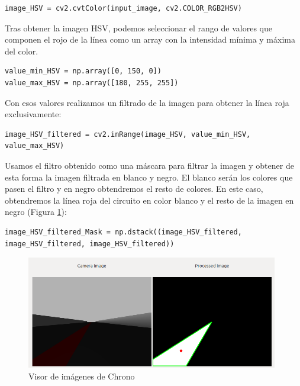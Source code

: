 \lstset{language=Python, breaklines=true, basicstyle=\footnotesize}
\begin{lstlisting}[frame=single]
image_HSV = cv2.cvtColor(input_image, cv2.COLOR_RGB2HSV)
\end{lstlisting}

Tras obtener la imagen HSV, podemos seleccionar el rango de valores que componen el rojo de la línea como un array con la intensidad mínima y máxima del color.

\lstset{language=Python, breaklines=true, basicstyle=\footnotesize}
\begin{lstlisting}[frame=single]
value_min_HSV = np.array([0, 150, 0])
value_max_HSV = np.array([180, 255, 255])
\end{lstlisting}

Con esos valores realizamos un filtrado de la imagen para obtener la línea roja exclusivamente:

\lstset{language=Python, breaklines=true, basicstyle=\footnotesize}
\begin{lstlisting}[frame=single]
image_HSV_filtered = cv2.inRange(image_HSV, value_min_HSV, value_max_HSV)
\end{lstlisting}

Usamos el filtro obtenido como una máscara para filtrar la imagen y obtener de esta forma la imagen filtrada en blanco y negro. El blanco serán los colores que pasen el filtro y en negro obtendremos el resto de colores. En este caso, obtendremos la línea roja del circuito en color blanco y el resto de la imagen en negro (Figura \ref{fig.vich2}):

\lstset{language=Python, breaklines=true, basicstyle=\footnotesize}
\begin{lstlisting}[frame=single]
image_HSV_filtered_Mask = np.dstack((image_HSV_filtered, image_HSV_filtered, image_HSV_filtered))
\end{lstlisting}

\begin{figure}[H]
  \begin{center}
    \includegraphics[width=0.98\textwidth]{figures/visor_imagen_chrono.png}
		\caption{Visor de imágenes de Chrono}
		\label{fig.vich2}
		\end{center}
\end{figure}

